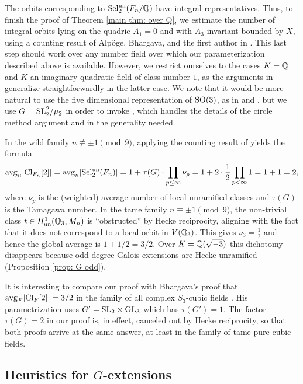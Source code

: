 \documentclass[11pt,a4paper]{amsart}
\def\Q{{\rm \mathbb{Q}}}
\def\un{{\rm un}}
\def\avg{{\rm avg}}
\def\Cl{{\rm Cl}}
\def\SL{{\rm SL}}
\def\SO{{\rm SO}}
\def\GL{{\rm GL}}
\def\Sel{{\rm Sel}}
\numberwithin{equation}{section}
\begin{document}
The orbits corresponding to $\Sel_2^\un(F_n/\Q)$ have integral representatives. Thus, to finish the proof of Theorem \ref{main thm: over Q}, we estimate the number of integral orbits lying on the quadric $A_1 = 0$ and with $A_3$-invariant bounded by $X$, using a counting result of Alp\"oge, Bhargava, and the first author in  \cite{AlpogeBhargavaShnidman}.    This last step should work over any number field over which our parameterization described above is available. However, we restrict ourselves to the cases $K = \Q$ and $K$ an imaginary quadratic field of class number $1$, as the arguments in \cite{AlpogeBhargavaShnidman} generalize straightforwardly in the latter case.  We note that it would be more natural to use the five dimensional representation of $\SO(3)$, as in \cite{BhargavaGross2013} and \cite{AlpogeThesis}, but we use $G = \SL_2^2/\mu_2$ in order to invoke  \cite{AlpogeBhargavaShnidman}, which handles the details of the circle method argument and in the generality needed. 

In the wild family $n \not\equiv \pm 1\pmod{9}$,  applying the counting result of \cite{AlpogeBhargavaShnidman} yields the formula 
\[\avg_n |\Cl_{F_n}[2]| = \avg_n |\Sel_2^\un(F_n)| = 1 + \tau(G)\cdot \prod_{p \leq \infty} \nu_p = 1 + 2 \cdot \frac12 \prod_{p < \infty}1 = 1 + 1 = 2,\] 
where  $\nu_p$ is the (weighted) average number of local unramified classes and $\tau(G)$ is the Tamagawa number. In the tame family $n \equiv \pm1 \pmod{9}$, the non-trivial class $t \in H^1_\un(\Q_3,M_n)$ is ``obstructed'' by Hecke reciprocity, aligning with the fact that it does not correspond to a local orbit in $V(\Q_3)$. This gives $\nu_3 = \frac12$ and hence the global average is $1 + 1/2 = 3/2$. Over $K = \Q(\sqrt{-3})$ this dichotomy disappears because odd degree Galois extensions are Hecke unramified (Proposition \ref{prop: G odd}). 

It is interesting to compare our proof with Bhargava's proof that $\mathrm{avg}_F |\Cl_F[2]| = 3/2$ in the family of all complex $S_3$-cubic fields \cite{BhargavaQuartics}. His parametrization uses  $G' =\SL_2 \times \GL_3$ which has $\tau(G') = 1$. The factor $\tau(G) = 2$ in our proof is, in effect, canceled out by Hecke reciprocity, so that both proofs arrive at the same answer, at least in the family of tame pure cubic fields.  


\subsection{Heuristics for $G$-extensions}
\end{document}
